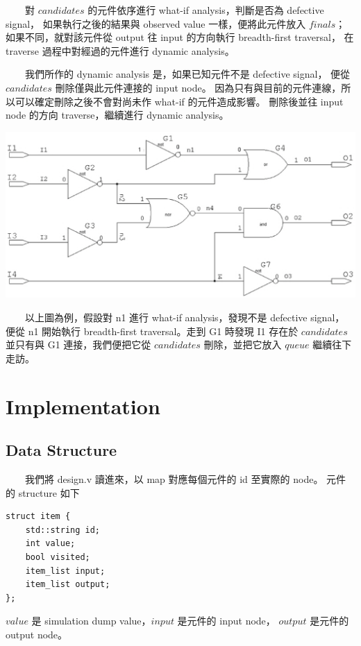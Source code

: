 \documentclass[12pt,a4paper]{article}
\begin{document}
\begin{CJK*}{UTF8}{song}
　　對 $candidates$ 的元件依序進行 what-if analysis，判斷是否為 defective signal，%
如果執行之後的結果與 observed value 一樣，便將此元件放入 $finals$；%
如果不同，就對該元件從 output 往 input 的方向執行 breadth-first traversal，%
在 traverse 過程中對經過的元件進行 dynamic analysis。

　　我們所作的 dynamic analysis 是，如果已知元件不是 defective signal，%
便從 $candidates$ 刪除僅與此元件連接的 input node。%
因為只有與目前的元件連線，所以可以確定刪除之後不會對尚未作 what-if 的元件造成影響。%
刪除後並往 input node 的方向 traverse，繼續進行 dynamic analysis。

\begin{center}
\includegraphics[scale=0.6]{imgs/04.eps}
\end{center}

　　以上圖為例，假設對 n1 進行 what-if analysis，發現不是 defective signal，%
便從 n1 開始執行 breadth-first traversal。走到 G1 時發現 I1 存在於 $candidates$ %
並只有與 G1 連接，我們便把它從 $candidates$ 刪除，並把它放入 $queue$ 繼續往下走訪。

\section{Implementation}

\subsection{Data Structure}

　　我們將 design.v 讀進來，以 map 對應每個元件的 id 至實際的 node。%
元件的 structure 如下

\begin{verbatim}
struct item {
    std::string id;
    int value;
    bool visited;
    item_list input;
    item_list output;
};
\end{verbatim}

$value$ 是 simulation dump value，$input$ 是元件的 input node，%
$output$ 是元件的 output node。


\end{CJK*}
\end{document}
